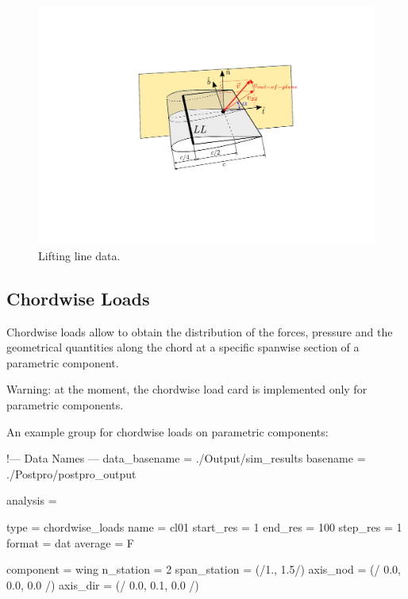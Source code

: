 \begin{figure}[h]
\centering
\includegraphics[width=1.0\textwidth, trim = 100 180 100 145, clip]{./images/ll_output_2} 
\caption{Lifting line data.}
\label{fig:ll_output}
\end{figure}

\subsection{Chordwise Loads} 
Chordwise loads allow to obtain the distribution of the forces, pressure and the geometrical
quantities along the chord at a specific spanwise section of a parametric component. 

Warning: at the moment, the chordwise load card is implemented only for parametric components. 

An example  group for chordwise loads on parametric components:

\begin{inputfile}[frame=single, caption={dust\_post.in for chordwise load 
  on parametric components}, label={file:dust_post.in_chordwise_param}]
!--- Data Names ---
data_basename = ./Output/sim_results
basename =     ./Postpro/postpro_output

analysis = {

  type = chordwise_loads
  name = cl01
  start_res = 1
  end_res = 100
  step_res = 1
  format = dat
  average = F
  
  component = wing
  n_station  = 2
  span_station = (/1., 1.5/) 
  axis_nod = (/ 0.0, 0.0, 0.0 /)
  axis_dir = (/ 0.0, 0.1, 0.0 /)

}
\end{inputfile}

